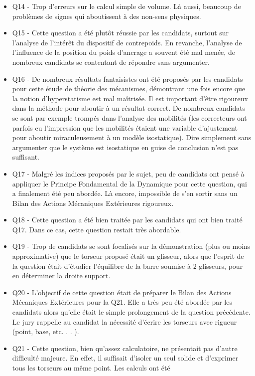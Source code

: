 \documentclass[10pt,fleqn]{article} %
\begin{document}
\begin{itemize}
\item Q14 - Trop d’erreurs sur le calcul simple de volume. Là aussi, beaucoup de problèmes de signes qui
aboutissent à des non-sens physiques.
\item Q15 - Cette question a été plutôt réussie par les candidats, surtout sur l’analyse de l’intérêt du
dispositif de contrepoids. En revanche, l’analyse de l’influence de la position du poids d’ancrage a
souvent été mal menée, de nombreux candidats se contentant de répondre sans argumenter.
\item Q16 - De nombreux résultats fantaisistes ont été proposés par les candidats pour cette étude de théorie
des mécanismes, démontrant une fois encore que la notion d’hyperstatisme est mal maîtrisée. Il est
important d’être rigoureux dans la méthode pour aboutir à un résultat correct. De nombreux candidats
se sont par exemple trompés dans l’analyse des mobilités (les correcteurs ont parfois eu l’impression que
les mobilités étaient une variable d’ajustement pour aboutir miraculeusement à un modèle isostatique).
Dire simplement sans argumenter que le système est isostatique en guise de conclusion n’est pas
suffisant.
\item Q17 - Malgré les indices proposés par le sujet, peu de candidats ont pensé à appliquer le Principe
Fondamental de la Dynamique pour cette question, qui a finalement été peu abordée. Là encore,
impossible de s’en sortir sans un Bilan des Actions Mécaniques Extérieures rigoureux.
\item Q18 - Cette question a été bien traitée par les candidats qui ont bien traité Q17. Dans ce cas, cette
question restait très abordable.
\item Q19 - Trop de candidats se sont focalisés sur la démonstration (plus ou moins approximative) que le
torseur proposé était un glisseur, alors que l’esprit de la question était d’étudier l’équilibre de la barre
soumise à 2 glisseurs, pour en déterminer la droite support.
\item Q20 - L’objectif de cette question était de préparer le Bilan des Actions Mécaniques Extérieures pour
la Q21. Elle a très peu été abordée par les candidats alors qu’elle était le simple prolongement de la
question précédente. Le jury rappelle au candidat la nécessité d’écrire les torseurs avec rigueur (point,
base, etc. . . ).
\item Q21 - Cette question, bien qu’assez calculatoire, ne présentait pas d’autre difficulté majeure. En effet,
il suffisait d’isoler un seul solide et d’exprimer tous les torseurs au même point. Les calculs ont été

\end{itemize}
\end{document}
